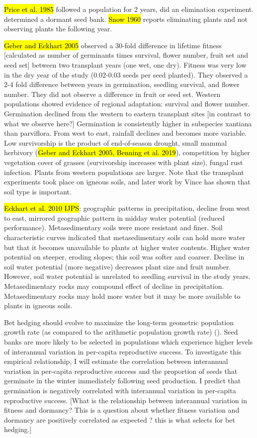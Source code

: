 \documentclass[12pt, oneside, titlepage]{article}   	%
\begin{document}
\hl{Price et al. 1985} followed a population for 2 years, did an elimination experiment. determined a dormant seed bank.  \hl{Snow 1960} reports eliminating plants and not observing plants the following year. 

\hl{Geber and Eckhart 2005} observed a 30-fold difference in lifetime fitness [calculated as number of germinants times survival, flower number, fruit set and seed set] between two transplant years (one wet, one dry). Fitness was very low in the dry year of the study (0.02-0.03 seeds per seed planted). They observed a 2-4 fold difference between years in germination, seedling survival, and flower number. They did not observe a difference in fruit or seed set. Western populations showed evidence of regional adaptation: survival and flower number. Germination declined from the western to eastern transplant sites [in contrast to what we observe here?] Germination is consistently higher in subspecies xantiana than parviflora. From west to east, rainfall declines and becomes more variable. Low survivorship is the product of end-of-season drought, small mammal herbivory (\hl{Geber and Eckhart 2005, Benning et al. 2019}), competition by higher vegetation cover of grasses (survivorship increases with plant size), fungal rust infection. Plants from western populations are larger. Note that the transplant experiments took place on igneous soils, and later work by Vince has shown that soil type is important. 

\hl{Eckhart et al. 2010 IJPS}: geographic patterns in precipitation, decline from west to east, mirrored geographic pattern in midday water potential (reduced performance). Metasedimentary soils were more resistant and finer. Soil characteristic curves indicated that metasedimentary soils can hold more water but that it becomes unavailable to plants at higher water contents. Higher water potential on steeper, eroding slopes; this soil was softer and coarser. Decline in soil water potential (more negative) decreases plant size and fruit number. However, soil water potential is unrelated to seedling survival in the study years. Metasedimentary rocks may compound effect of decline in precipitation. Metasedimentary rocks may hold more water but it may be more available to plants in igneous soils. 

Bet hedging should evolve to maximize the long-term geometric population growth rate (as compared to the arithmetic population growth rate) (\cite{cohen1966,cohen1968,ellner1985,ellner1985a}). Seed banks are more likely to be selected in populations which experience higher levels of interannual variation in per-capita reproductive success. To investigate this empirical relationship, I will estimate the correlation between interannual variation in per-capita reproductive success and the proportion of seeds that germinate in the winter immediately following seed production. I predict that germination is negatively correlated with interannual variation in per-capita reproductive success. [What is the relationship between interannual variation in fitness and dormancy? This is a question about whether fitness variation and dormancy are positively correlated as expected ? this is what selects for bet hedging.]
\end{document}
